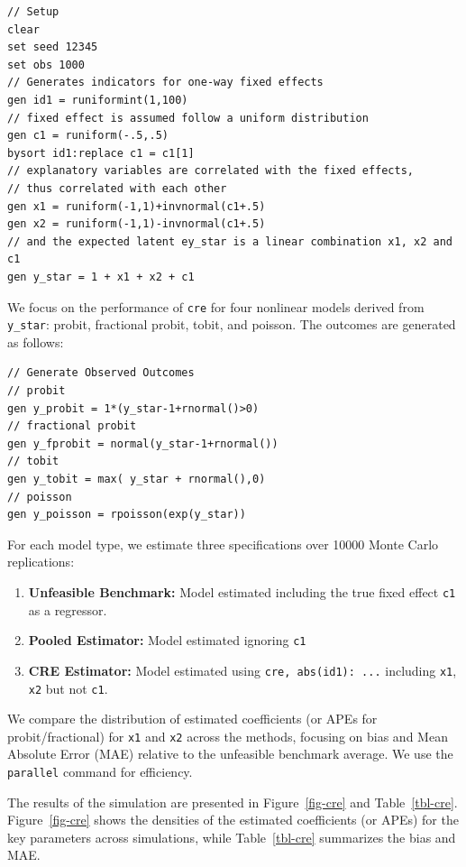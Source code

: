 \documentclass[bib]{statapress}
\providecommand{\tightlist}{%
  \setlength{\itemsep}{0pt}\setlength{\parskip}{0pt}}\usepackage{longtable,booktabs,array}
\begin{document}
\begin{verbatim}
// Setup
clear 
set seed 12345
set obs 1000
// Generates indicators for one-way fixed effects
gen id1 = runiformint(1,100)
// fixed effect is assumed follow a uniform distribution
gen c1 = runiform(-.5,.5)
bysort id1:replace c1 = c1[1]
// explanatory variables are correlated with the fixed effects, 
// thus correlated with each other
gen x1 = runiform(-1,1)+invnormal(c1+.5)
gen x2 = runiform(-1,1)-invnormal(c1+.5)
// and the expected latent ey_star is a linear combination x1, x2 and c1 
gen y_star = 1 + x1 + x2 + c1 
\end{verbatim}

We focus on the performance of \texttt{cre} for four nonlinear models
derived from \texttt{y\_star}: probit, fractional probit, tobit, and
poisson. The outcomes are generated as follows:

\begin{verbatim}
// Generate Observed Outcomes 
// probit
gen y_probit = 1*(y_star-1+rnormal()>0)
// fractional probit
gen y_fprobit = normal(y_star-1+rnormal())
// tobit
gen y_tobit = max( y_star + rnormal(),0)
// poisson
gen y_poisson = rpoisson(exp(y_star))
\end{verbatim}

For each model type, we estimate three specifications over 10000 Monte
Carlo replications:

\begin{enumerate}
\def\labelenumi{\arabic{enumi}.}
\tightlist
\item
  \textbf{Unfeasible Benchmark:} Model estimated including the true
  fixed effect \texttt{c1} as a regressor.
\item
  \textbf{Pooled Estimator:} Model estimated ignoring \texttt{c1}
\item
  \textbf{CRE Estimator:} Model estimated using
  \texttt{cre,\ abs(id1):\ ...} including \texttt{x1}, \texttt{x2} but
  not \texttt{c1}.
\end{enumerate}

We compare the distribution of estimated coefficients (or APEs for
probit/fractional) for \texttt{x1} and \texttt{x2} across the methods,
focusing on bias and Mean Absolute Error (MAE) relative to the
unfeasible benchmark average. We use the \texttt{parallel} command
\citep{vegayon2019} for efficiency.

The results of the simulation are presented in Figure~\ref{fig-cre} and
Table~\ref{tbl-cre}. Figure~\ref{fig-cre} shows the densities of the
estimated coefficients (or APEs) for the key parameters across
simulations, while Table~\ref{tbl-cre} summarizes the bias and MAE.
\end{document}
